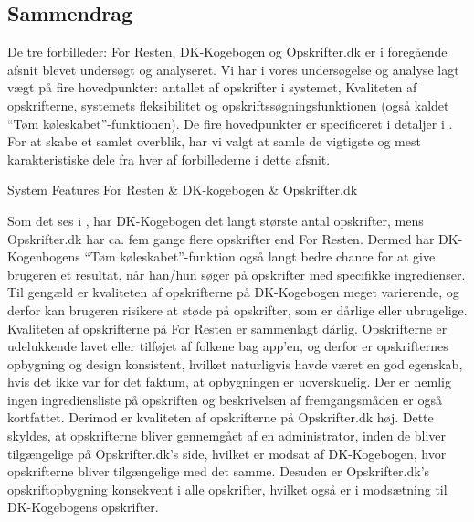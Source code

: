 \subsection{Sammendrag}
\label{sec:forbilleder:sammendrag}
De tre forbilleder: For Resten, DK-Kogebogen og Opskrifter.dk er i foregående afsnit blevet undersøgt og analyseret. Vi har i vores undersøgelse og analyse lagt vægt på fire hovedpunkter: antallet af opskrifter i systemet, Kvaliteten af opskrifterne, systemets fleksibilitet og opskriftssøgningsfunktionen (også kaldet ``Tøm køleskabet''-funktionen). De fire hovedpunkter er specificeret i detaljer i . For at skabe et samlet overblik, har vi valgt at samle de vigtigste og mest karakteristiske dele fra hver af forbillederne i dette afsnit.

                                            {System}
       { Features                  }{ For Resten   & DK-kogebogen   & Opskrifter.dk }{
}

Som det ses i , har DK-Kogebogen det langt største antal opskrifter, mens Opskrifter.dk har ca. fem gange flere opskrifter end For Resten. Dermed har DK-Kogenbogens ``Tøm køleskabet''-funktion også langt bedre chance for at give brugeren et resultat, når han/hun søger på opskrifter med specifikke ingredienser. Til gengæld er kvaliteten af opskrifterne på DK-Kogebogen meget varierende, og derfor kan brugeren risikere at støde på opskrifter, som er dårlige eller ubrugelige. Kvaliteten af opskrifterne på For Resten er sammenlagt dårlig. Opskrifterne er udelukkende lavet eller tilføjet af folkene bag app’en, og derfor er opskrifternes opbygning og design konsistent, hvilket naturligvis havde været en god egenskab, hvis det ikke var for det faktum, at opbygningen er uoverskuelig. Der er nemlig ingen ingrediensliste på opskriften og beskrivelsen af fremgangsmåden er også kortfattet. Derimod er kvaliteten af opskrifterne på Opskrifter.dk høj. Dette skyldes, at opskrifterne bliver gennemgået af en administrator, inden de bliver tilgængelige på Opskrifter.dk’s side, hvilket er modsat af DK-Kogebogen, hvor opskrifterne bliver tilgængelige med det samme. Desuden er Opskrifter.dk’s opskriftopbygning konsekvent i alle opskrifter, hvilket også er i modsætning til DK-Kogebogens opskrifter.

